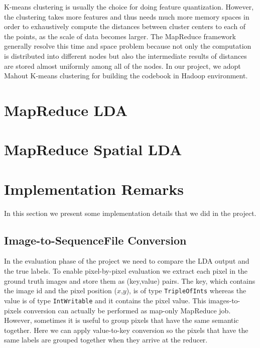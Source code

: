 \documentclass{acm_proc_article-sp}
\begin{document}
K-means clustering is usually the choice for doing feature quantization. However, the clustering takes more features and thus needs much more memory spaces in order to exhaustively compute the distances between cluster centers to each of the points, as the scale of data becomes larger. The MapReduce framework generally resolve this time and space problem because not only the computation is distributed into different nodes but also the intermediate results of distances are stored almost uniformly among all of the nodes. In our project, we adopt Mahout K-means clustering \cite{mahout} for building the codebook in Hadoop environment.
\section{MapReduce LDA}\label{sec:mrlda}
\cite{mrlda}

\section{MapReduce Spatial LDA}

\section{Implementation Remarks}\label{sec:impl}
In this section we present some implementation details that we did in the project.
\subsection{Image-to-SequenceFile Conversion}
In the evaluation phase of the project we need to compare the LDA output and the true labels. To enable pixel-by-pixel evaluation we extract each pixel in the ground truth images and store them as (key,value) pairs. The key, which contains the image id and the pixel position ($x$,$y$), is of type \texttt{TripleOfInts} whereas the value is of type \texttt{IntWritable} and it contains the pixel value. This images-to-pixels conversion can actually be performed as map-only MapReduce job. However, sometimes it is useful to group pixels that have the same semantic together. Here we can apply value-to-key conversion so the pixels that have the same labels are grouped together when they arrive at the reducer.
\end{document}
